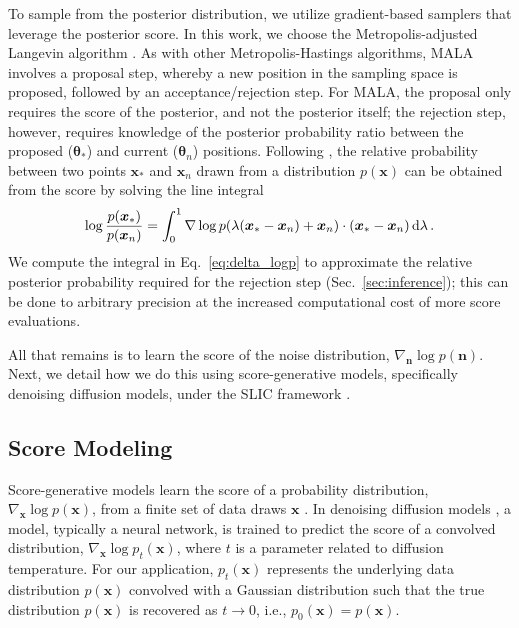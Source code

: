 \documentclass[twocolumn]{aastex631}
\begin{document}
To sample from the posterior distribution, we utilize gradient-based samplers that leverage the posterior score. In this work, we choose the Metropolis-adjusted Langevin algorithm \citep[MALA,][]{MALA}. As with other Metropolis-Hastings algorithms, MALA involves a proposal step, whereby a new position in the sampling space is proposed, followed by an acceptance/rejection step. For MALA, the proposal only requires the score of the posterior, and not the posterior itself; the rejection step, however, requires knowledge of the posterior probability ratio between the proposed ($\boldsymbol{\theta}_{*}$) and current ($\boldsymbol{\theta}_{n}$) positions.
%
Following \cite{2023Remy}, the relative probability between two points $\boldsymbol{x}_{*}$ and $\boldsymbol{x}_{n}$ drawn from a distribution $p(\boldsymbol{x})$ can be obtained from the score by solving the line integral
{\small
\begin{equation}
    \label{eq:delta_logp}
    \log \frac{p(\boldsymbol{x}_{*})}{p(\boldsymbol{x}_{n})} = \int_0^1 \nabla \log p(\lambda(\boldsymbol{x}_{*} - \boldsymbol{x}_n) + \boldsymbol{x}_n) \cdot (\boldsymbol{x}_{*} - \boldsymbol{x}_n) \, {\rm d}\lambda\, .
\end{equation}
}We compute the integral in Eq.~\eqref{eq:delta_logp} to approximate the relative posterior probability required for the rejection step (Sec.~\ref{sec:inference}); this can be done to arbitrary precision at the increased computational cost of more score evaluations.

All that remains is to learn the score of the noise distribution, $\nabla_{\boldsymbol{n}} \log p(\boldsymbol{n})$. Next, we detail how we do this using score-generative models, specifically denoising diffusion models, under the SLIC framework \citep{legin,Legin2023icml}.


\subsection{Score Modeling}
\label{sec:score_modeling}

Score-generative models learn the score of a probability distribution, $\nabla_{\boldsymbol{x}} \log p(\boldsymbol{x})$, from a finite set of data draws $\boldsymbol{x}$ \citep{Hyvarinen2005, song2020sde, Ho2020}. In denoising diffusion models \citep{2019arXiv190705600S, song2020sde, Ho2020, 2022arXiv220900796Y}, a model, typically a neural network, is trained to predict the score of a convolved distribution, $\nabla_{\boldsymbol{x}} \log p_{t}(\boldsymbol{x})$, where $t$ is a parameter related to diffusion temperature. For our application, $p_{t}(\boldsymbol{x})$ represents the underlying data distribution $p(\boldsymbol{x})$ convolved with a Gaussian distribution such that the true distribution $p(\boldsymbol{x})$ is recovered as $t \to 0$, i.e., $p_0(\boldsymbol{x}) = p(\boldsymbol{x})$.
\end{document}
